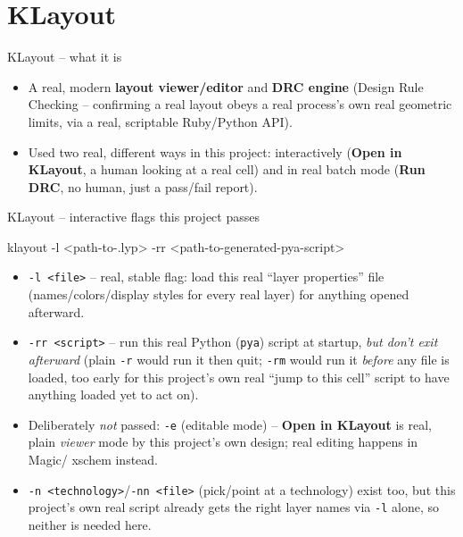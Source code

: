 \documentclass[aspectratio=169]{beamer}
\begin{document}
\section{KLayout}
\begin{frame}{KLayout -- what it is}
\begin{itemize}
  \item A real, modern \textbf{layout viewer/editor} and
        \textbf{DRC engine} (Design Rule Checking -- confirming a
        real layout obeys a real process's own real geometric limits,
        via a real, scriptable Ruby/Python API).
  \item Used two real, different ways in this project: interactively
        (\textbf{Open in KLayout}, a human looking at a real cell) and
        in real batch mode (\textbf{Run DRC}, no human, just a
        pass/fail report).
\end{itemize}
\end{frame}

\begin{frame}[fragile]{KLayout -- interactive flags this project passes}
\begin{cli}
klayout -l <path-to-.lyp> -rr <path-to-generated-pya-script>
\end{cli}
\begin{itemize}
  \item \texttt{-l <file>} -- real, stable flag: load this real
        ``layer properties'' file (names/colors/display styles for
        every real layer) for anything opened afterward.
  \item \texttt{-rr <script>} -- run this real Python
        (\texttt{pya}) script at startup, \emph{but don't exit
        afterward} (plain \texttt{-r} would run it then quit;
        \texttt{-rm} would run it \emph{before} any file is loaded,
        too early for this project's own real ``jump to this cell''
        script to have anything loaded yet to act on).
  \item Deliberately \emph{not} passed: \texttt{-e} (editable mode) --
        \textbf{Open in KLayout} is real, plain \emph{viewer} mode by
        this project's own design; real editing happens in Magic/
        xschem instead.
  \item \texttt{-n <technology>}/\texttt{-nn <file>} (pick/point at a
        technology) exist too, but this project's own real script
        already gets the right layer names via \texttt{-l} alone, so
        neither is needed here.
\end{itemize}
\end{frame}
\end{document}
